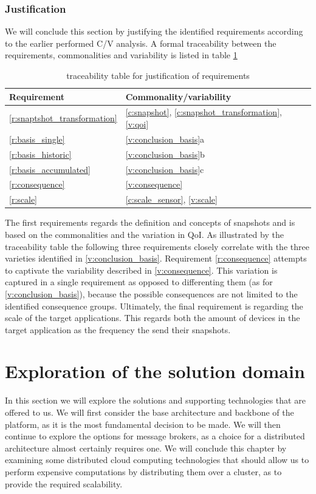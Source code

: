 \subsubsection*{Justification}
We will conclude this section by justifying the identified requirements according to the earlier performed C/V analysis. A formal traceability between the requirements, commonalities and variability is listed in table \ref{table:3_justification}

\begin{table}[H]
\centering
\begin{tabular}{|l|l|} \hline
Requirement & Commonality/variability  \\ \hline
\ref{r:snaptshot_transformation} & \ref{c:snapshot}, \ref{c:snapshot_transformation}, \ref{v:qoi} \\ \hline
\ref{r:basis_single} & \ref{v:conclusion_basis}a \\ \hline
\ref{r:basis_historic} & \ref{v:conclusion_basis}b \\ \hline
\ref{r:basis_accumulated} & \ref{v:conclusion_basis}c \\ \hline
\ref{r:consequence} & \ref{v:consequence} \\ \hline
\ref{r:scale} & \ref{c:scale_sensor}, \ref{v:scale} \\ \hline
\end{tabular}
\caption{traceability table for justification of requirements}
\label{table:3_justification}
\end{table}

The first requirements regards the definition and concepts of snapshots and is based on the commonalities and the variation in QoI.  As illustrated by the traceability table the following three requirements closely correlate with the three varieties identified in \ref{v:conclusion_basis}. Requirement \ref{r:consequence} attempts to captivate the variability described in \ref{v:consequence}. This variation is captured in a single requirement as opposed to differenting them (as for \ref{v:conclusion_basis}), because the possible consequences are not limited to the identified consequence groups. Ultimately, the final requirement is regarding the scale of the target applications. This regards both the amount of devices in the target application as the frequency the send their snapshots. 

\section{Exploration of the solution domain}
In this section we will explore the solutions and supporting technologies that are offered to us. We will first consider the base architecture and backbone of the platform, as it is the most fundamental decision to be made. We will then continue to explore the options for message brokers, as a choice for a distributed architecture almost certainly requires one. We will conclude this chapter by examining some distributed cloud computing technologies that should allow us to perform expensive computations by distributing them over a cluster, as to provide the required scalability.
